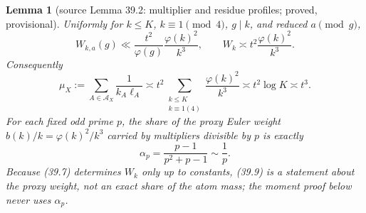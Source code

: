 \documentclass[10pt,reqno]{amsart}
\newtheorem{lemma}[theorem]{Lemma}
\theoremstyle{definition}
\newcommand{\1}{\mathbf 1}
\begin{document}
\begin{lemma}[source Lemma 39.2: multiplier and residue profiles; proved,
provisional]\label{lem:profiles}
Uniformly for $k\leq K$, $k\equiv1\pmod4$, $g\mid k$, and reduced
$a\pmod g$,
\begin{equation}\tag{39.7}
 W_{k,a}(g)\ll \frac{t^2}{\varphi(g)}\frac{\varphi(k)^2}{k^3},
 \qquad W_k\asymp t^2\frac{\varphi(k)^2}{k^3}.
\end{equation}
Consequently
\begin{equation}\tag{39.8}
 \mu_X:=\sum_{A\in\mathcal A_X}\frac1{k_A\ell_A}
 \asymp t^2\sum_{\substack{k\leq K\\k\equiv1(4)}}
             \frac{\varphi(k)^2}{k^3}
 \asymp t^2\log K\asymp t^3.
\end{equation}
For each fixed odd prime $p$, the share of the proxy Euler weight
$b(k)/k=\varphi(k)^2/k^3$ carried by multipliers divisible by $p$ is
exactly
\begin{equation}\tag{39.9}
 \alpha_p=\frac{p-1}{p^2+p-1}\sim\frac1p.
\end{equation}
Because (39.7) determines $W_k$ only up to constants, (39.9) is a statement
about the proxy weight, not an exact share of the atom mass; the moment proof
below never uses $\alpha_p$.
\end{lemma}
\end{document}
